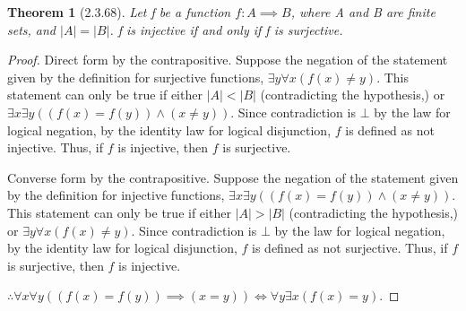 \documentclass[a4paper, 12pt]{article}
\theoremstyle{plain}
\newtheorem*{theorem*}{Theorem}
\begin{document}
	
	\begin{theorem*}[2.3.68]
		Let f be a function $f: A \implies B$, where A and B are finite sets, and $|A| = |B|$. f is injective if and only if f is surjective.
	\end{theorem*}
	
	\begin{proof}
		Direct form by the contrapositive. Suppose the negation of the \newline statement given by the definition for surjective functions, $\exists y \forall x (f(x) \ne y)$. This statement can only be true if either $|A| < |B|$ (contradicting the \newline hypothesis,) or $\exists x \exists y ((f(x) = f(y)) \land (x \ne y))$. Since contradiction is $\bot$ by the law for logical negation, by the identity law for logical disjunction, $f$ is defined as not injective. Thus, if $f$ is injective, then $f$ is surjective.
		
		Converse form by the contrapositive. Suppose the negation of the \newline statement given by the definition for injective functions, \newline $\exists x \exists y ((f(x) = f(y)) \land (x \ne y))$. 
		This statement can only be true if either $|A| > |B|$ (contradicting the hypothesis,) or $\exists y \forall x (f(x) \ne y)$. Since \newline contradiction is $\bot$ by the law for logical negation, by the identity law for logical disjunction, $f$ is defined as not surjective. Thus, if $f$ is surjective, then $f$ is injective.
		
		$\therefore \forall x \forall y ((f(x) = f(y)) \implies (x = y)) \iff \forall y \exists x (f(x) = y)$.
	\end{proof}
\end{document}
